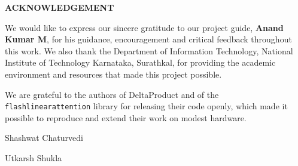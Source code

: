 \thispagestyle{empty}
\clearpage
\begin{center}
	\textbf{{\Large ACKNOWLEDGEMENT}}\\
    \thispagestyle{empty}
\end{center}
\justifying
We would like to express our sincere gratitude to our project guide, \textbf{Anand Kumar M}, for his guidance, encouragement and critical feedback throughout this work. We also thank the Department of Information Technology, National Institute of Technology Karnataka, Surathkal, for providing the academic environment and resources that made this project possible.

We are grateful to the authors of DeltaProduct and of the \texttt{flash\-linear\-attention} library for releasing their code openly, which made it possible to reproduce and extend their work on modest hardware.
\vspace{2cm}

\noindent
\begin{minipage}[t]{0.48\textwidth}
    \raggedright
    Shashwat Chaturvedi
\end{minipage}
\hfill
\begin{minipage}[t]{0.48\textwidth}
    \raggedleft
    Utkarsh Shukla
\end{minipage}
\thispagestyle{empty}
\clearpage